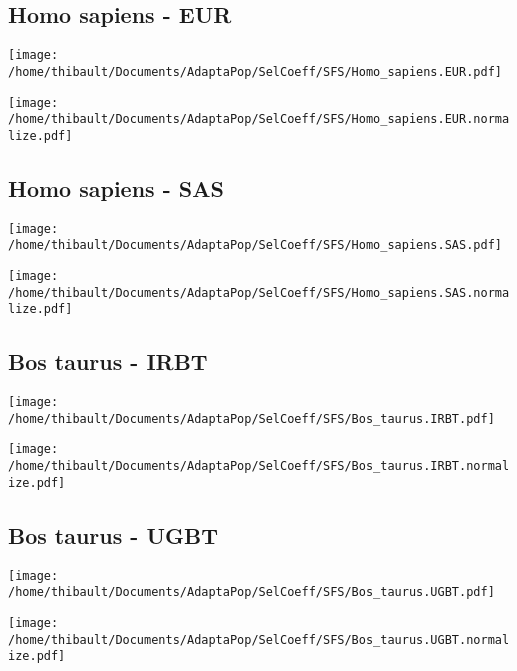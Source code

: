 \subsection{Homo sapiens - EUR} 
 
\begin{minipage}{0.49\linewidth} 
\texttt{[image: /home/thibault/Documents/AdaptaPop/SelCoeff/SFS/Homo\_sapiens.EUR.pdf]} 
\end{minipage}
\begin{minipage}{0.49\linewidth}
\texttt{[image: /home/thibault/Documents/AdaptaPop/SelCoeff/SFS/Homo\_sapiens.EUR.normalize.pdf]} 
\end{minipage}
\subsection{Homo sapiens - SAS} 
 
\begin{minipage}{0.49\linewidth} 
\texttt{[image: /home/thibault/Documents/AdaptaPop/SelCoeff/SFS/Homo\_sapiens.SAS.pdf]} 
\end{minipage}
\begin{minipage}{0.49\linewidth}
\texttt{[image: /home/thibault/Documents/AdaptaPop/SelCoeff/SFS/Homo\_sapiens.SAS.normalize.pdf]} 
\end{minipage}
\subsection{Bos taurus - IRBT} 
 
\begin{minipage}{0.49\linewidth} 
\texttt{[image: /home/thibault/Documents/AdaptaPop/SelCoeff/SFS/Bos\_taurus.IRBT.pdf]} 
\end{minipage}
\begin{minipage}{0.49\linewidth}
\texttt{[image: /home/thibault/Documents/AdaptaPop/SelCoeff/SFS/Bos\_taurus.IRBT.normalize.pdf]} 
\end{minipage}
\subsection{Bos taurus - UGBT} 
 
\begin{minipage}{0.49\linewidth} 
\texttt{[image: /home/thibault/Documents/AdaptaPop/SelCoeff/SFS/Bos\_taurus.UGBT.pdf]} 
\end{minipage}
\begin{minipage}{0.49\linewidth}
\texttt{[image: /home/thibault/Documents/AdaptaPop/SelCoeff/SFS/Bos\_taurus.UGBT.normalize.pdf]} 
\end{minipage}
